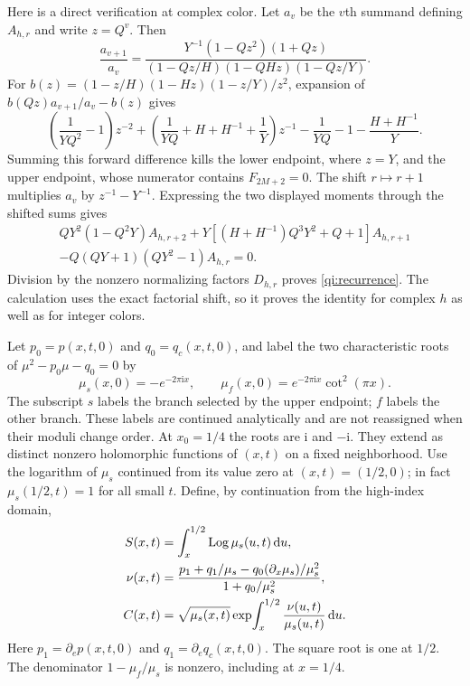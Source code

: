 \documentclass[11pt]{article}
\numberwithin{equation}{section}
\theoremstyle{remark}\newtheorem{remark}[theorem]{Remark}
\newcommand{\ii}{\mathrm i}
\newcommand{\dd}{\,\mathrm d}
\newcommand{\Log}{\operatorname{Log}}
\begin{document}
Here is a direct verification at complex color. Let $a_v$ be the
$v$th summand defining $A_{h,r}$ and write $z=Q^v$. Then
\[
 \frac{a_{v+1}}{a_v}
 =\frac{Y^{-1}(1-Qz^2)(1+Qz)}
 {(1-Qz/H)(1-QHz)(1-Qz/Y)}.
\]
For $b(z)=(1-z/H)(1-Hz)(1-z/Y)/z^2$, expansion of
$b(Qz)a_{v+1}/a_v-b(z)$ gives
\[
 \left(\frac1{YQ^2}-1\right)z^{-2}
 +\left(\frac1{YQ}+H+H^{-1}+\frac1Y\right)z^{-1}
 -\frac1{YQ}-1-\frac{H+H^{-1}}Y.
\]
Summing this forward difference kills the lower endpoint, where
$z=Y$, and the upper endpoint, whose numerator contains $F_{2M+2}=0$.
The shift $r\mapsto r+1$ multiplies $a_v$ by
$z^{-1}-Y^{-1}$. Expressing the two displayed moments through the
shifted sums gives
\begin{multline}\label{qi:unnormalized-recurrence}
 QY^2(1-Q^2Y)A_{h,r+2}
 +Y[(H+H^{-1})Q^3Y^2+Q+1]A_{h,r+1}\\
 -Q(QY+1)(QY^2-1)A_{h,r}=0.
\end{multline}
Division by the nonzero normalizing factors $D_{h,r}$ proves
\eqref{qi:recurrence}. The calculation uses the exact factorial shift,
so it proves the identity for complex $h$ as well as for integer colors.

Let $p_0=p(x,t,0)$ and $q_0=q_c(x,t,0)$, and label the two characteristic roots of
$\mu^2-p_0\mu-q_0=0$ by
\begin{equation}\label{qi:roots}
 \mu_s(x,0)=-e^{-2\pi\ii x},\qquad
 \mu_f(x,0)=e^{-2\pi\ii x}\cot^2(\pi x).
\end{equation}
The subscript $s$ labels the branch selected by the upper endpoint;
$f$ labels the other branch. These labels are continued analytically
and are not reassigned when their moduli change order. At
$x_0=1/4$ the roots are $\ii$ and $-\ii$. They extend as distinct nonzero holomorphic functions of $(x,t)$ on a fixed neighborhood.
Use the logarithm of $\mu_s$ continued from its value zero at
$(x,t)=(1/2,0)$; in fact $\mu_s(1/2,t)=1$ for all small $t$.
Define, by continuation from the high-index domain,
\begin{align}
 S(x,t)&=\int_x^{1/2}\Log\mu_s(u,t)\dd u,\notag\\
 \nu(x,t)&=
 \frac{p_1+q_1/\mu_s-q_0(\partial_x\mu_s)/\mu_s^2}
                   {1+q_0/\mu_s^2},\notag\\
 C(x,t)&=\sqrt{\mu_s(x,t)}
       \exp\!\int_x^{1/2}\frac{\nu(u,t)}{\mu_s(u,t)}\dd u.\label{qi:SC}
\end{align}
Here $p_1=\partial_ep(x,t,0)$ and $q_1=\partial_eq_c(x,t,0)$.
The square root is one at $1/2$. The denominator
$1-\mu_f/\mu_s$ is nonzero, including at $x=1/4$.
\end{document}
